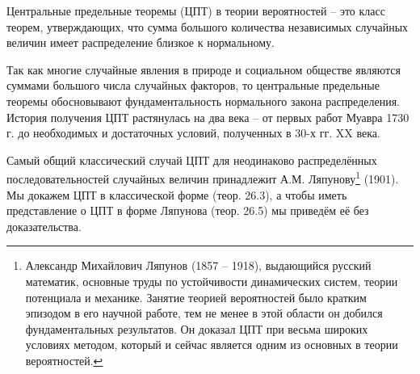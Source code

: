 

\begin{zam}
Центральные предельные теоремы (ЦПТ) в теории вероятностей -- это класс теорем, утверждающих, что сумма большого количества независимых случайных величин имеет распределение близкое к нормальному. 

Так как многие случайные явления в природе и социальном обществе являются суммами большого числа случайных факторов, то центральные предельные теоремы обосновывают фундаментальность нормального закона распределения. История получения ЦПТ растянулась на два века -- от первых работ Муавра 1730 г. до необходимых и достаточных условий, полученных в 30-х гг. XX века. 

Самый общий классический случай ЦПТ для неодинаково распределённых последовательностей случайных величин принадлежит А.М. Ляпунову\footnote{Александр Михайлович Ляпунов (1857 -- 1918), выдающийся русский математик, основные труды
по устойчивости динамических систем, теории потенциала и механике. Занятие теорией вероятностей было кратким эпизодом в его научной работе, тем не менее в этой области он добился фундаментальных результатов. Он доказал ЦПТ при весьма широких условиях методом, который и сейчас является одним
из основных в теории вероятностей.} (1901). Мы докажем ЦПТ в классической форме (теор. 26.3), а чтобы иметь представление о ЦПТ в форме Ляпунова (теор. 26.5) мы приведём её без доказательства. 
\end{zam}


